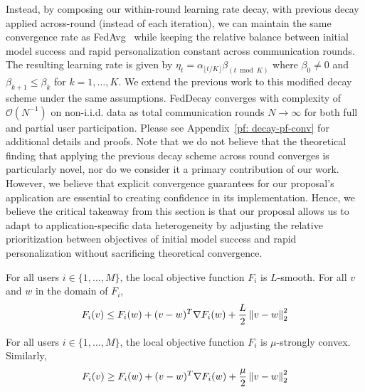 Instead, by composing our within-round learning rate decay, with previous decay applied across-round (instead of each iteration), we can maintain the same convergence rate as FedAvg~\citep{fedavg-conv} while keeping the relative balance between initial model success and rapid personalization constant across communication rounds. 
The resulting learning rate is given by $\eta_t = \alpha_{\lfloor t / K \rfloor} \beta_{(t \bmod K)}$ where $\beta_0 \neq 0$ and $\beta_{k + 1} \leq \beta_k$ for $k = 1, \ldots, K$.
We extend the previous work \citet{fedavg-conv} to this modified decay scheme under the same assumptions.
FedDecay converges with complexity of $\mathcal{O}(N^{-1})$ on non-i.i.d. data as total communication rounds $N \rightarrow \infty$ for both full and partial user participation.
Please see Appendix~\ref{pf: decay-pf-conv} for additional details and proofs.
Note that we do not believe that the theoretical finding that applying the previous decay scheme across round converges is particularly novel, nor do we consider it a primary contribution of our work.
However, we believe that explicit convergence guarantees for our proposal's application are essential to creating confidence in its implementation.
Hence, we believe the critical takeaway from this section is that our proposal allows us to adapt to application-specific data heterogeneity by adjusting the relative prioritization between objectives of initial model success and rapid personalization without sacrificing theoretical convergence.

\begin{assumption}
\label{ass: lipschitz}
    For all users $i \in \{1, \ldots, M\}$, the local objective function $F_i$ is $L$-smooth. For all $v$ and $w$ in the domain of $F_i$, 
    \begin{align*}
        F_i(v) \leq F_i(w) + (v - w)^T \nabla F_i(w) + \dfrac{L}{2} \left\lVert v - w\right\rVert_2^2 
    \end{align*}
\end{assumption}

\begin{assumption}
\label{ass: convex}
    For all users $i \in \{1, \ldots, M\}$, the local objective function $F_i$ is $\mu$-strongly convex. Similarly, 
    \begin{align*}
        F_i(v) \geq F_i(w) + (v - w)^T \nabla F_i(w) + \dfrac{\mu}{2} \left\lVert v - w\right\rVert_2^2
    \end{align*}
\end{assumption}


